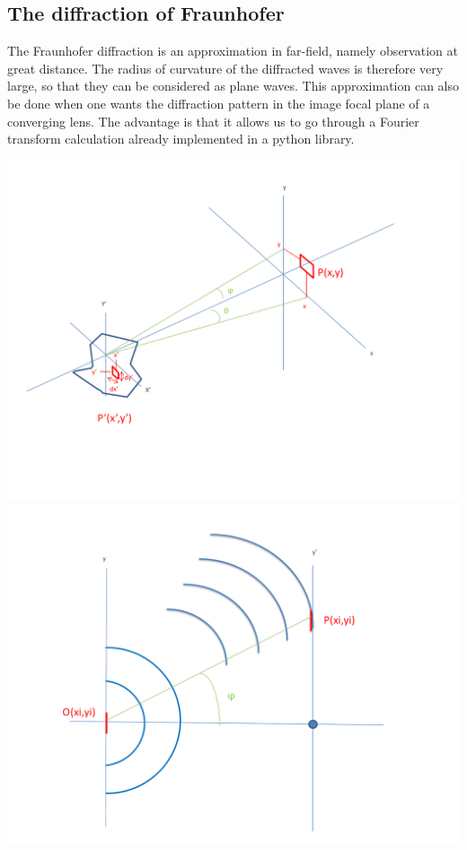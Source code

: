 \documentclass[10pt,a4paper]{article}
\begin{document}
	\subsection{The diffraction of Fraunhofer}
The Fraunhofer diffraction is an approximation in far-field, namely observation at great distance. The radius of curvature of the diffracted waves is therefore very large, so that they can be considered as plane waves. This approximation can also be done when one wants the diffraction pattern in the image focal plane of a converging lens. The advantage is that it allows us to go through a Fourier transform calculation already implemented in a python library.

\begin{center}
\includegraphics[scale=0.32]{../Ressources/schema-1.png}
\includegraphics[scale=0.32]{../Ressources/schema-2.png}
\end{center}
\end{document}

